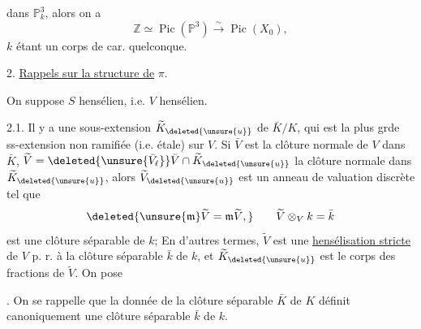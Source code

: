 
dans $\mathbb P^3_k$, alors on a
\[
 \mathbb Z\simeq\operatorname{Pic}(\mathbb P^3)\xrightarrow{\sim}\operatorname{Pic}(X_0),
\]
$k$ étant un corps de car. quelconque.

2. \uline{Rappels sur la structure de} $\pi$.

On suppose $S$ hensélien, i.e. $V$ hensélien.

2.1. Il y a une sous-extension $\widetilde K_{\deleted{\unsure{u}}}$ de $\bar K/K$, qui est la plus grde ss-extension non ramifiée (i.e. étale)  sur $V$. Si  $\bar V$ est la clôture normale de $V$ dans $\bar K$, $\widetilde V=\deleted{\unsure{\bar V_\ell}}\bar V\cap\widetilde K_{\deleted{\unsure{u}}}$ la clôture normale dans $\widetilde K_{\deleted{\unsure{u}}}$, alors $\widetilde V_{\deleted{\unsure{u}}}$ est un anneau de valuation discrète tel que
\[
 \deleted{\unsure{\mathfrak m}\widetilde V=\mathfrak m\widetilde V,}
 \qquad \widetilde V\otimes_V k=\bar k
\]
est une  clôture séparable de $k$; En d'autres termes, $\widetilde V$ est une \uline{hensélisation stricte} de $V$ p. r. à  la  clôture séparable $\bar k$ de $k$, et $\widetilde K_{\deleted{\unsure{u}}}$ est le corps des fractions de $\widetilde V$. On pose
\inserted{
\[
\begin{cases}
\widetilde S=\operatorname{Spec}\widetilde V=\text{hensélisé strict de }S\\
\unsure{\bar s}=\operatorname{Spec}\bar k.
\end{cases}
\]
}

. On se rappelle que  la donnée de la clôture séparable $\bar K$ de $K$ définit canoniquement une clôture séparable $\bar k$ de $k$.

